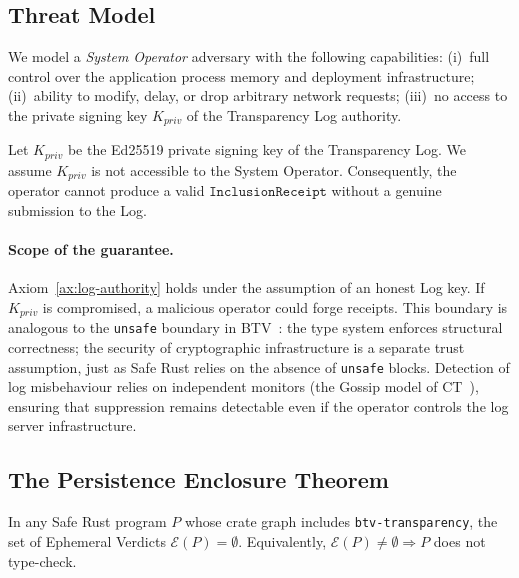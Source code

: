\subsection{Threat Model}

We model a \emph{System Operator} adversary with the following capabilities:
(i)~full control over the application process memory and deployment
infrastructure; (ii)~ability to modify, delay, or drop arbitrary network
requests; (iii)~no access to the private signing key $K_{\mathit{priv}}$ of the
Transparency Log authority.

\begin{axiom}
\label{ax:log-authority}
Let $K_{\mathit{priv}}$ be the Ed25519 private signing key of the Transparency
Log. We assume $K_{\mathit{priv}}$ is not accessible to the System Operator.
Consequently, the operator cannot produce a valid
$\mathtt{InclusionReceipt}$ without a genuine submission to the Log.
\end{axiom}

\paragraph{Scope of the guarantee.}
Axiom~\ref{ax:log-authority} holds under the assumption of an honest Log key.
If $K_{\mathit{priv}}$ is compromised, a malicious operator could forge
receipts. This boundary is analogous to the \texttt{unsafe} boundary in
BTV~\cite{btv2026}: the type system enforces structural correctness; the
security of cryptographic infrastructure is a separate trust assumption, just
as Safe Rust relies on the absence of \texttt{unsafe} blocks. Detection of log
misbehaviour relies on independent monitors (the Gossip model of CT~\cite{rfc6962}),
ensuring that suppression remains detectable even if the operator controls
the log server infrastructure.

\subsection{The Persistence Enclosure Theorem}

\begin{theorem}
\label{thm:persistence-enclosure}
In any Safe Rust program $P$ whose crate graph includes \texttt{btv-transparency},
the set of Ephemeral Verdicts $\mathcal{E}(P) = \emptyset$.
Equivalently, $\mathcal{E}(P) \neq \emptyset \Rightarrow P$ does not type-check.
\end{theorem}


